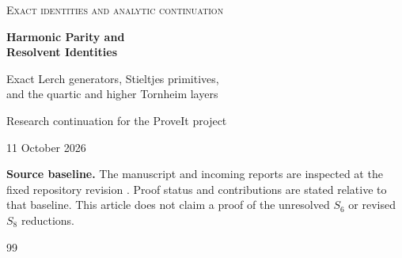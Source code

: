 

\begin{titlepage}
\thispagestyle{empty}
\vspace*{12mm}
\begin{center}
{\small\scshape Exact identities and analytic continuation\par}
\vspace{9mm}
{\LARGE\bfseries Harmonic Parity and\\[3pt] Resolvent Identities\par}
\vspace{6mm}
{\large Exact Lerch generators, Stieltjes primitives,\\
and the quartic and higher Tornheim layers\par}
\vspace{10mm}
{\normalsize Research continuation for the ProveIt project\par}
\vspace{3mm}
{\normalsize 11 October 2026\par}
\end{center}
\vspace{8mm}

\vfill
\noindent\textbf{Source baseline.}
The manuscript and incoming reports are inspected at the fixed repository
revision \snapshot. Proof status and contributions are stated relative to
that baseline. This article does not claim a proof of the unresolved
$S_6$ or revised $S_8$ reductions.
\end{titlepage}
\tableofcontents
\clearpage








\clearpage
{}
{}
\begingroup
\small
\begin{thebibliography}{99}

\end{thebibliography}
\endgroup

